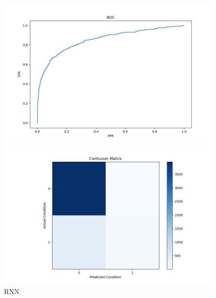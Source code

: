 \documentclass[UTF8]{article}
\begin{document}
\begin{figure}[h]
    \begin{minipage}{.48\linewidth}
        \centering
        \includegraphics[width=\linewidth]{../figure/RNN_ROC.jpg}
    \end{minipage}
    \begin{minipage}{.48    \linewidth}
        \centering
        \includegraphics[width=\linewidth]{../figure/RNN_Confusion.jpg}
    \end{minipage}
    \caption{RNN}
    \label{fig:RNN}
\end{figure}
\end{document}
